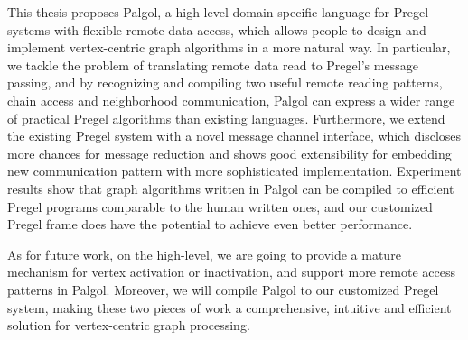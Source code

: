 \documentclass{sokendai_thesis} %
\begin{document}
This thesis proposes Palgol, a high-level domain-specific language for Pregel systems with flexible remote data access, which allows people to design and implement vertex-centric graph algorithms in a more natural way.
In particular, we tackle the problem of translating remote data read to Pregel's message passing, and by recognizing and compiling two useful remote reading patterns, chain access and neighborhood communication, Palgol can express a wider range of practical Pregel algorithms than existing languages.
Furthermore, we extend the existing Pregel system with a novel message channel interface, which discloses more chances for message reduction and shows good extensibility for embedding new communication pattern with more sophisticated implementation.
Experiment results show that graph algorithms written in Palgol can be compiled to efficient Pregel programs comparable to the human written ones, and our customized Pregel frame does have the potential to achieve even better performance.

As for future work, on the high-level, we are going to provide a mature mechanism for vertex activation or inactivation, and support more remote access patterns in Palgol.
Moreover, we will compile Palgol to our customized Pregel system, making these two pieces of work a comprehensive, intuitive and efficient solution for vertex-centric graph processing.





%





\begin{appendices}

%

\end{appendices}
\end{document}
